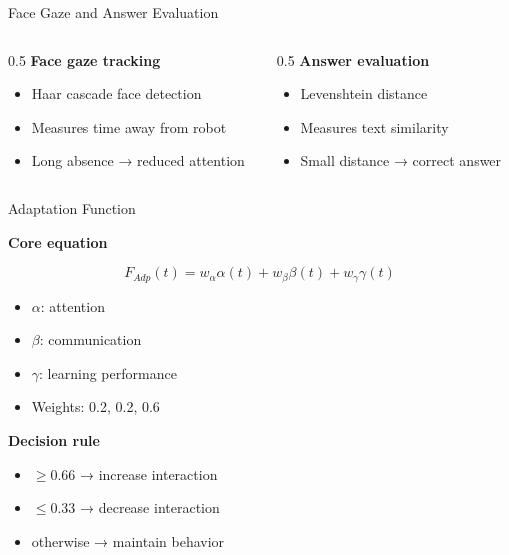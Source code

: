 \documentclass[aspectratio=169,10pt]{beamer}
\begin{document}
\begin{frame}{Face Gaze and Answer Evaluation}
\footnotesize

\begin{columns}[T]

\begin{column}{0.5\textwidth}
\textbf{Face gaze tracking}
\begin{itemize}\footnotesize
    \item Haar cascade face detection
    \item Measures time away from robot
    \item Long absence → reduced attention
\end{itemize}
\end{column}

\begin{column}{0.5\textwidth}
\textbf{Answer evaluation}
\begin{itemize}\footnotesize
    \item Levenshtein distance
    \item Measures text similarity
    \item Small distance → correct answer
\end{itemize}
\end{column}

\end{columns}

\end{frame}


\begin{frame}{Adaptation Function}
\footnotesize

\textbf{Core equation}

\[
F_{Adp}(t) = w_{\alpha}\alpha(t) + w_{\beta}\beta(t) + w_{\gamma}\gamma(t)
\]

\vspace{0.5em}

\begin{itemize}\footnotesize
    \item $\alpha$: attention
    \item $\beta$: communication
    \item $\gamma$: learning performance
    \item Weights: 0.2, 0.2, 0.6
\end{itemize}

\vspace{0.5em}

\textbf{Decision rule}
\begin{itemize}\footnotesize
    \item $\geq 0.66$ → increase interaction
    \item $\leq 0.33$ → decrease interaction
    \item otherwise → maintain behavior
\end{itemize}

\end{frame}
\end{document}
